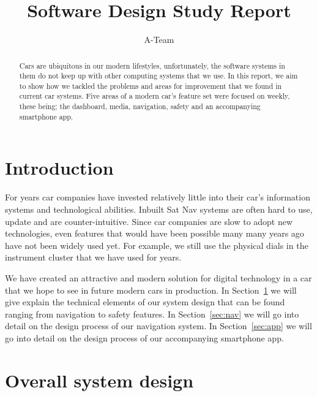 \documentclass{article}
\title{Software Design Study Report}
\author{A-Team}
\begin{document}
\maketitle

\begin{abstract}
  Cars are ubiquitous in our modern lifestyles, unfortunately, the software systems in them do not keep up with other computing systems that we use. In this report, we aim to show how we tackled the problems and areas for improvement that we found in current car systems. Five areas of a modern car's feature set were focused on weekly, these being; the dashboard, media, navigation, safety and an accompanying smartphone app.
\end{abstract}

\section*{Introduction}
For years car companies have invested relatively little into their car's information systems and technological abilities. Inbuilt Sat Nav systems are often hard to use, update and are counter-intuitive. Since car companies are slow to adopt new technologies, even features that would have been possible many many years ago have not been widely used yet. For example, we still use the physical dials in the instrument cluster that we have used for years.

We have created an attractive and modern solution for digital technology in a car that we hope to see in future modern cars in production. In Section~\ref{sec:system-design} we will give explain the technical elements of our system design that can be found ranging from navigation to safety features. In Section~\ref{sec:nav} we will go into detail on the design process of our navigation system. In Section~\ref{sec:app} we will go into detail on the design process of our accompanying smartphone app.

\section{Overall system design}\label{sec:system-design}
\end{document}
